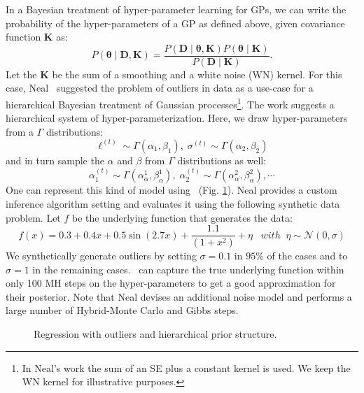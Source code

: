 In a Bayesian treatment of  hyper-parameter learning for \ac{GP}s,
we can write the probability of the hyper-parameters of a GP as
defined above, given covariance function $\mathbf{K}$ as:
\begin{equation}
\label{eq:hyperProbability}
P(\bm{\theta} \mid \mathbf{D,K}) = \frac{P(\mathbf{D} \mid \bm{\theta}, \mathbf{K})P(\bm{\theta} \mid  \mathbf{K})}{P(\mathbf{D} \mid \mathbf{K})}.
\end{equation}
Let the $\mathbf{K}$ be the sum of a smoothing and a white noise (WN) kernel. For this case, Neal~\citeyearpar{neal1997monte} suggested the problem of outliers in data as a use-case for a hierarchical Bayesian treatment of Gaussian processes\footnote{In Neal's work \citeyearpar{neal1997monte} the sum of an SE plus a constant kernel is used. We keep the WN kernel for illustrative purposes.}. The work suggests a hierarchical system of hyper-parameterization. Here, we draw hyper-parameters from a $\Gamma$ distributions:
\begin{equation}
\label{eq:hyper-ell}
\ell^{(t)} \sim \Gamma(\alpha_1,\beta_1),\;\sigma^{(t)} \sim \Gamma(\alpha_2,\beta_2)
\end{equation} 
and in turn sample the $\alpha$ and $\beta$ from $\Gamma$ distributions as well:
\begin{equation}
\label{eq:hyper-alpha}
\alpha_1^{(t)} \sim \Gamma(\alpha^1_{\alpha},\beta^1_{ \alpha } ),\; \alpha_2^{(t)} \sim \Gamma(\alpha^2_{\alpha},\beta^2_{\alpha}),\cdots
\end{equation}
One can represent this kind of model using \gpmem\ (Fig. \ref{fig:neal_tutorial}).
Neal provides a custom inference algorithm setting and evaluates it using the following synthetic data problem. Let $f$ be the underlying function that generates the data:
\begin{equation}
f(x) =  0.3 + 0.4 x + 0.5 \sin(2.7x) + \frac{1.1}{(1+ x^2)} + \eta \;\;\; with\;\;\eta \sim \mathcal{N}(0,\sigma)
\end{equation}
We synthetically generate outliers by setting $\sigma = 0.1$ in $95\%$ of the cases and to $\sigma = 1$ in the remaining cases. \gpmem\  can capture the true underlying function within only 100 MH steps on the hyper-parameters to get a good approximation for their posterior. Note that Neal devises an additional noise model and performs a large number of Hybrid-Monte Carlo and Gibbs steps.  



\begin{figure}

\caption{Regression with outliers and hierarchical prior structure.}
\label{fig:neal_tutorial}
\end{figure}



